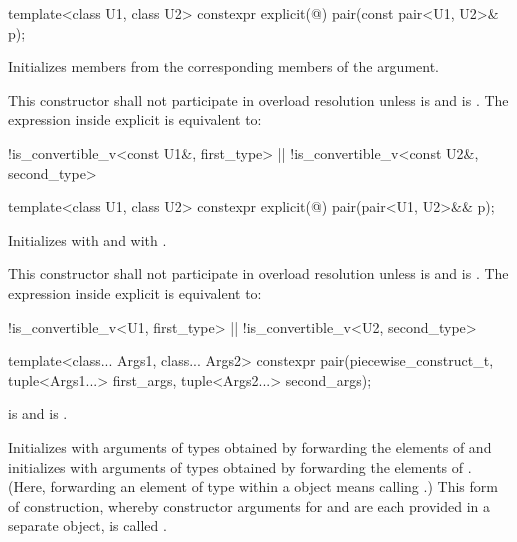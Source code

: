 %
\begin{itemdecl}
template<class U1, class U2> constexpr explicit(@\seebelow@) pair(const pair<U1, U2>& p);
\end{itemdecl}

\begin{itemdescr}
\pnum
\effects
Initializes members from the corresponding members of the argument.

\pnum
\remarks
This constructor shall not participate in overload resolution unless
 is  and
 is .
The expression inside explicit is equivalent to:
\begin{codeblock}
!is_convertible_v<const U1&, first_type> || !is_convertible_v<const U2&, second_type>
\end{codeblock}
\end{itemdescr}

%
\begin{itemdecl}
template<class U1, class U2> constexpr explicit(@\seebelow@) pair(pair<U1, U2>&& p);
\end{itemdecl}

\begin{itemdescr}
\pnum
\effects
Initializes  with
and  with
.

\pnum
\remarks
This constructor shall not participate in overload resolution unless
 is  and
 is .
The expression inside explicit is equivalent to:
\begin{codeblock}
!is_convertible_v<U1, first_type> || !is_convertible_v<U2, second_type>
\end{codeblock}
\end{itemdescr}

%
\begin{itemdecl}
template<class... Args1, class... Args2>
  constexpr pair(piecewise_construct_t,
                 tuple<Args1...> first_args, tuple<Args2...> second_args);
\end{itemdecl}

\begin{itemdescr}
\pnum
\requires {} is 
and  is .

\pnum
\effects
Initializes  with arguments of types
 obtained by forwarding the elements of 
and initializes  with arguments of types 
obtained by forwarding the elements of . (Here, forwarding
an element  of type  within a  object means calling
.) This form of construction, whereby constructor
arguments for  and  are each provided in a separate
 object, is called .
\end{itemdescr}

